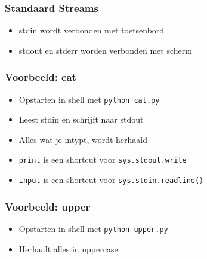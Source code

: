 \documentclass[dutch]{ucll-slides}
\begin{document}
\begin{frame}
  \frametitle{Standaard Streams}
  \begin{center}
  \end{center}
  \begin{itemize}
    \item stdin wordt verbonden met toetsenbord
    \item stdout en stderr worden verbonden met scherm
  \end{itemize}
\end{frame}

\begin{frame}
  \frametitle{Voorbeeld: cat}
  \begin{overprint}
  \end{overprint}
  \begin{itemize}
    \item Opstarten in shell met \texttt{python cat.py}
    \item Leest stdin en schrijft naar stdout
    \item Alles wat je intypt, wordt herhaald
    \item<2-> \texttt{print} is een shortcut voor \texttt{sys.stdout.write}
    \item<2-> \texttt{input} is een shortcut voor \texttt{sys.stdin.readline()}
  \end{itemize}
\end{frame}

\begin{frame}
  \frametitle{Voorbeeld: upper}
  \begin{itemize}
    \item Opstarten in shell met \texttt{python upper.py}
    \item Herhaalt alles in uppercase
  \end{itemize}
\end{frame}
\end{document}
